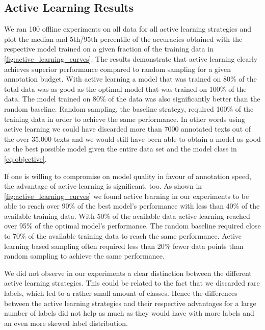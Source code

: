 \documentclass[runningheads,a4paper]{article}
\begin{document}
\subsection{Active Learning Results}
\label{sec:active_learning_results}
We ran 100 offline experiments on all data for all active learning strategies and plot the median and 5th/95th percentile of the accuracies obtained with the respective model trained on a given fraction of the training data in \autoref{fig:active_learning_curves}. The results demonstrate that active learning clearly achieves superior performance compared to random sampling for a given annotation budget. With active learning a model that was trained on 80\% of the total data was as good as the optimal model that was trained on 100\% of the data. The model trained on 80\% of the data was also significantly better than the random baseline. Random sampling, the baseline strategy, required 100\% of the training data in order to achieve the same performance. 
In other words using active learning we could have discarded more than 7000 annotated texts out of the over 35,000 texts and we would still have been able to obtain a model as good as the best possible model given the entire data set and the model class in \autoref{eq:objective}.

If one is willing to compromise on model quality in favour of annotation speed, the advantage of active learning is significant, too. As shown in \autoref{fig:active_learning_curves} we found active learning in our experiments to be able to reach over 90\% of the best model's performance with less than 40\% of the available training data. With 50\% of the available data active learning reached over 95\% of the optimal model's performance. The random baseline required close to 70\% of the available training data to reach the same performance. 
Active learning based sampling often required less than 20\% fewer data points than random sampling to achieve the same performance. 

We did not observe in our experiments a clear distinction between the different active learning strategies. This could be related to the fact that we discarded rare labels, which led to a rather small amount of classes. Hence the differences between the active learning strategies and their respective advantages for a large number of labels did not help as much as they would have with more labels and an even more skewed label distribution. 
\end{document}
